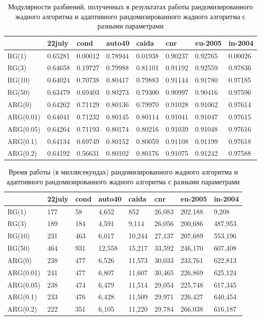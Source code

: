 \begin{table}[H]
	\caption{Модулярности разбиений, полученных в результатах работы рандомизированного жадного алгоритма и адаптивного рандомизированного жадного алгоритма с разными параметрами}
	\label{tab:arg-res-q}
	\begin{tabularx}{\textwidth}{XR{1.5cm}R{1.5cm}R{1.5cm}R{1.5cm}R{1.5cm}R{1.5cm}R{1.5cm}}\hline
				& 22july 	& cond 		& auto40	& caida 	& cnr 		& eu-2005	& in-2004		\\\hline
	RG(1) 		& 0.65281	& 0.00012 	& 0.78944	& 0.01938	& 0.90237 	& 0.92765	& 0.00026	\\
	RG(3)		& 0.64658	& 0.19727	& 0.79988	& 0.81101	& 0.91192	& 0.92559	& 0.97836	\\
	RG(10)		& 0.64024	& 0.70738	& 0.80417	& 0.79883	& 0.91144	& 0.91780	& 0.97185	\\
	RG(50)		& 0.63479	& 0.69403	& 0.80273	& 0.79300	& 0.90997	& 0.90416	& 0.97596	\\
	ARG(0)		& 0.64262	& 0.71129	& 0.80136	& 0.79970	& 0.91028	& 0.91062	& 0.97614	\\
	ARG(0.01)	& 0.64041	& 0.71232	& 0.80145	& 0.80114	& 0.91041	& 0.91047	& 0.97615	\\
	ARG(0.05)	& 0.64264	& 0.71193	& 0.80174	& 0.80216	& 0.91039	& 0.91048	& 0.97616	\\
	ARG(0.1)	& 0.64134	& 0.69749	& 0.80152	& 0.80059	& 0.91108	& 0.91199	& 0.97618	\\
	ARG(0.2)	& 0.64192	& 0.56631	& 0.80102	& 0.80176	& 0.91075	& 0.91242	& 0.97588	\\\hline
	\end{tabularx}
\end{table}
\begin{table}[H]
	\caption{Время работы (в миллисекундах) рандомизированного жадного алгоритма и адаптивного рандомизированного жадного алгоритма с разными параметрами}
	\label{tab:arg-res-t}
	\begin{tabularx}{\textwidth}{XR{1.5cm}R{1.5cm}R{1.5cm}R{1.5cm}R{1.5cm}R{1.5cm}R{1.5cm}}\hline
				& 22july 	& cond 		& auto40	& caida 	& cnr 		& eu-2005	& in-2004	\\\hline
	RG(1) 		& 177		& 58 		& 4,652		& 852		& 26,083	& 202,188	& 9,208		\\
	RG(3)		& 189		& 184		& 4,591		& 9,114		& 26,056	& 200,686	& 487,953	\\
	RG(10)		& 231		& 463		& 6,017		& 10,244	& 27,137	& 207,689	& 553,196	\\
	RG(50)		& 464		& 931		& 12,558	& 15,217	& 33,592	& 246,170	& 607,408	\\
	ARG(0)		& 238		& 477		& 6,526		& 11,573	& 30,033	& 233,761	& 622,813	\\
	ARG(0.01)	& 241		& 477		& 6,807		& 11,607	& 30,465	& 226,869	& 625,124	\\
	ARG(0.05)	& 238		& 474		& 6,479		& 11,514	& 29,054	& 225,748	& 617,345	\\
	ARG(0.1)	& 233		& 476		& 6,428		& 11,509	& 29,971	& 226,427	& 640,454	\\
	ARG(0.2)	& 222		& 351		& 6,105		& 11,220	& 29,784	& 266,038	& 616,187	\\\hline
	\end{tabularx}
\end{table}

